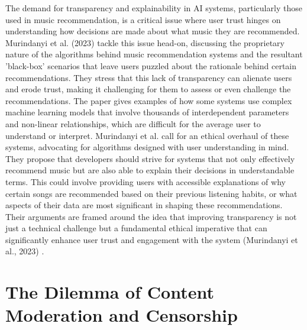 \documentclass[10pt,twocolumn]{article}
\begin{document}
The demand for transparency and explainability in AI systems, particularly those used in music recommendation, is a critical issue where user trust hinges on understanding how decisions are made about what music they are recommended. Murindanyi et al. (2023) \cite{murindanyi2023responsible} tackle this issue head-on, discussing the proprietary nature of the algorithms behind music recommendation systems and the resultant 'black-box' scenarios that leave users puzzled about the rationale behind certain recommendations. They stress that this lack of transparency can alienate users and erode trust, making it challenging for them to assess or even challenge the recommendations. The paper gives examples of how some systems use complex machine learning models that involve thousands of interdependent parameters and non-linear relationships, which are difficult for the average user to understand or interpret. Murindanyi et al.\cite{murindanyi2023responsible} call for an ethical overhaul of these systems, advocating for algorithms designed with user understanding in mind. They propose that developers should strive for systems that not only effectively recommend music but are also able to explain their decisions in understandable terms. This could involve providing users with accessible explanations of why certain songs are recommended based on their previous listening habits, or what aspects of their data are most significant in shaping these recommendations. Their arguments are framed around the idea that improving transparency is not just a technical challenge but a fundamental ethical imperative that can significantly enhance user trust and engagement with the system (Murindanyi et al., 2023) \cite{murindanyi2023responsible}.

\section{The Dilemma of Content Moderation and Censorship}
\end{document}
